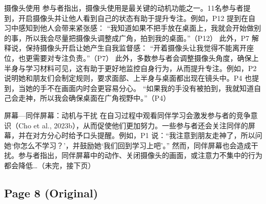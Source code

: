 \documentclass[12pt]{ctexart}
\begin{document}
摄像头使用
参与者指出，摄像头使用是最关键的动机功能之一。11名参与者提到，开启摄像头并让他人看到自己的状态有助于提升专注。例如，P12 提到在自习中感知到他人会带来紧张感：
“我知道如果不把手放在桌面上，我就会开始做别的事，所以我会尽量把摄像头调整成广角，拍到我的桌面。”（P12）
此外，P7 解释说，保持摄像头开启让她产生自我监督感：
“开着摄像头让我觉得不能离开座位，也更需要对专注负责。”（P7）
此外，多数参与者会调整摄像头角度，确保上半身与学习材料可见，这有助于更好地监控自身行为，从而提升专注。例如，P2 说明她和朋友们会制定规则，要求面部、上半身与桌面都出现在镜头中。P4 也提到，当她的手不在画面内时会更容易分心。
“如果我的手没有被拍到，我就知道自己会走神，所以我会确保桌面在广角视野中。”（P4）

屏幕—同伴屏幕：动机与干扰
在自习过程中观看同伴学习会激发参与者的竞争意识（Cho et al., 2023b），从而促使他们更加努力。一些参与者还会关注同伴的屏幕，并在对方分心时给予口头提醒。例如，P1 说：“我注意到朋友走神了，所以问她‘你怎么不学习？’，并鼓励她‘我们回到学习上吧’。”
然而，同伴屏幕也会造成干扰。参与者指出，同伴屏幕中的动作、关闭摄像头的画面，或注意力不集中的行为都会降低…（未完，接下页）


\subsection*{Page 8 (Original)}
\end{document}
